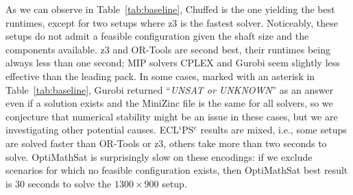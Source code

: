As we can observe in Table~\ref{tab:baseline}, Chuffed is
the one yielding the best runtimes, except for two
setups where z3 is the fastest solver. Noticeably, these setups do 
not admit a feasible configuration given the shaft size and the
components available. z3 and OR-Tools are second best, their runtimes
being always less than one second; MIP solvers CPLEX and Gurobi seem
slightly less effective than the leading pack. In some cases, marked 
with an asterisk in Table~\ref{tab:baseline}, Gurobi returned 
``\textit{UNSAT or UNKNOWN}'' as an answer even if a solution exists
and the MiniZinc file is the same for all solvers, so we conjecture 
that numerical stability might be an issue in these cases, but we are 
investigating other potential causes. ECL$^i$PS$^e$ results are mixed, 
i.e., some setups are solved faster than OR-Tools or z3, others take
more than two seconds to solve. OptiMathSat is surprisingly slow on 
these encodings: if we exclude scenarios for which no feasible 
configuration exists, then OptiMathSat best result is 30 seconds to 
solve the $1300 \times 900$ setup.

